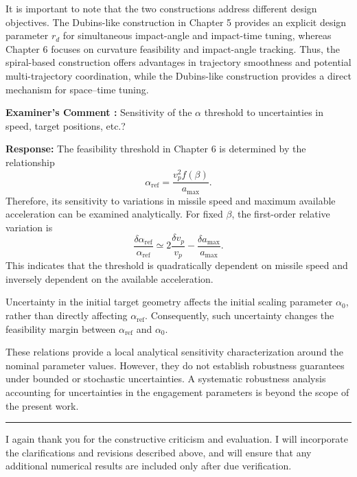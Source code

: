 \documentclass[11pt,a4paper]{article}
\newcounter{examcomment}
\renewcommand{\theexamcomment}{\arabic{examcomment}}
\newcommand{\comment}[1]{%
\refstepcounter{examcomment}%
\par\vspace{5pt}\noindent
\colorbox{gray!13}{%
	\parbox{\dimexpr\linewidth-2\fboxsep}{%
		\textbf{Examiner's Comment \theexamcomment:} #1%
	}%
}%
\par
}
\newcommand{\response}{\par\textbf{Response:} }
\newcommand{\revision}{\par\textbf{Proposed thesis revision:} }
\begin{document}
It is important to note that the two constructions address different
design objectives. The Dubins-like construction in Chapter 5 provides
an explicit design parameter $r_d$ for simultaneous impact-angle and
impact-time tuning, whereas Chapter 6 focuses on curvature feasibility
and impact-angle tracking. Thus, the spiral-based construction offers
advantages in trajectory smoothness and potential multi-trajectory
coordination, while the Dubins-like construction provides a direct
mechanism for space--time tuning.


\comment{Sensitivity of the $\alpha$ threshold to uncertainties in speed, target positions, etc.?}
\response
The feasibility threshold in Chapter 6 is determined by the
relationship
\[
\alpha_{\mathrm{ref}}=\frac{v_p^2 f(\beta)}{a_{\max}}.
\]
Therefore, its sensitivity to variations in missile speed and
maximum available acceleration can be examined analytically.
For fixed $\beta$, the first-order relative variation is
\[
\frac{\delta\alpha_{\mathrm{ref}}}{\alpha_{\mathrm{ref}}}
\simeq
2\frac{\delta v_p}{v_p}
-\frac{\delta a_{\max}}{a_{\max}}.
\]
This indicates that the threshold is quadratically dependent on
missile speed and inversely dependent on the available acceleration.

Uncertainty in the initial target geometry affects the initial
scaling parameter $\alpha_0$, rather than directly affecting
$\alpha_{\mathrm{ref}}$. Consequently, such uncertainty changes
the feasibility margin between $\alpha_{\mathrm{ref}}$ and
$\alpha_0$.

These relations provide a local analytical sensitivity
characterization around the nominal parameter values. However,
they do not establish robustness guarantees under bounded or
stochastic uncertainties. A systematic robustness analysis
accounting for uncertainties in the engagement parameters is
beyond the scope of the present work.

\vspace{10pt}
\hrule
\vspace{8pt}
I again thank you for the constructive criticism and evaluation. I will incorporate the clarifications and revisions described above, and will ensure that any additional numerical results are included only after due verification.
\end{document}
